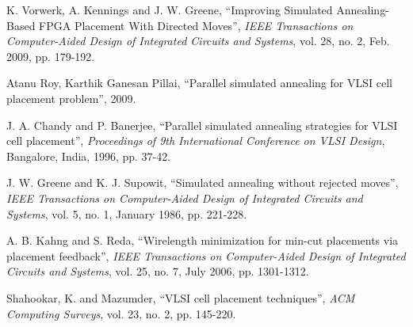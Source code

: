 \documentclass[conference]{IEEEtran}
\begin{document}
\begin{thebibliography}{00}
 K. Vorwerk, A. Kennings and J. W. Greene, ``Improving Simulated Annealing-Based FPGA Placement With Directed Moves'', \textit{IEEE Transactions on Computer-Aided Design of Integrated Circuits and Systems}, vol. 28, no. 2, Feb. 2009, pp. 179-192.

 Atanu Roy, Karthik Ganesan Pillai, ``Parallel simulated annealing for VLSI
cell placement problem'', 2009.

 J. A. Chandy and P. Banerjee, ``Parallel simulated annealing strategies for VLSI cell placement'', \textit{Proceedings of 9th International Conference on VLSI Design}, Bangalore, India, 1996, pp. 37-42.

 J. W. Greene and K. J. Supowit, ``Simulated annealing without rejected moves'', \textit{IEEE Transactions on Computer-Aided Design of Integrated Circuits and Systems}, vol. 5, no. 1, January 1986, pp. 221-228.

 A. B. Kahng and S. Reda, ``Wirelength minimization for min-cut placements via placement feedback'', \textit{IEEE Transactions on Computer-Aided Design of Integrated Circuits and Systems}, vol. 25, no. 7, July 2006, pp. 1301-1312.

 Shahookar, K. and Mazumder, ``VLSI cell placement techniques'', \textit{ACM Computing Surveys}, vol. 23, no. 2, pp. 145-220.

\end{thebibliography}
\end{document}
